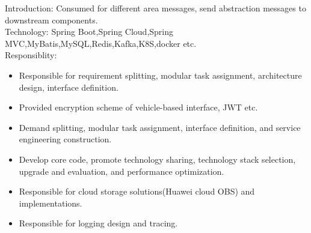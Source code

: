 \documentclass{resume}
\begin{document}
Introduction: Consumed for different area messages, send abstraction messages to downstream components.\\
Technology: Spring Boot,Spring Cloud,Spring MVC,MyBatis,MySQL,Redis,Kafka,K8S,docker etc.\\
Responsiblity:
\begin{itemize}
\item Responsible for requirement splitting, modular task assignment, architecture design, interface definition.
\item Provided encryption scheme of vehicle-based interface, JWT etc.
\item Demand splitting, modular task assignment, interface definition, and service engineering construction.
\item Develop core code, promote technology sharing, technology stack selection, upgrade and evaluation, and performance optimization.
\item Responsible for cloud storage solutions(Huawei cloud OBS) and implementations.
\item Responsible for logging design and tracing.
\end{itemize}
\end{document}

